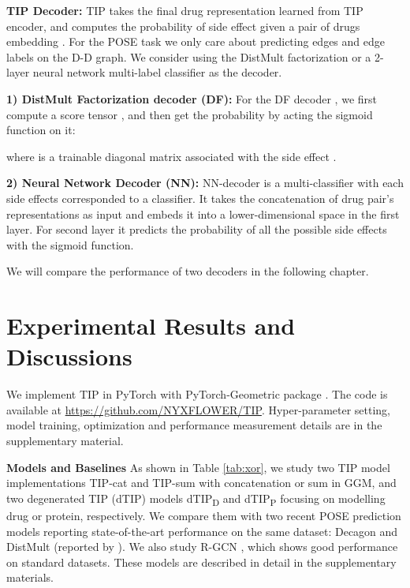\documentclass{article}
\begin{document}
\textbf{TIP Decoder:}
TIP takes the final drug representation  learned from  TIP encoder, and computes the probability  of side effect  given a pair of drugs embedding . For the POSE task we only care about predicting edges and edge labels on the  D-D graph. We consider using the DistMult factorization \cite{distmult} or a 2-layer neural network multi-label classifier as the decoder.

\textbf{1) DistMult Factorization decoder  (DF):} For the DF decoder \cite{distmult}, we first compute a  score tensor , and then get the probability by acting the sigmoid function on it:

where  is a trainable diagonal matrix associated with the side effect .

\textbf{2) Neural Network Decoder (NN):}
 NN-decoder is a multi-classifier with each side effects corresponded to a classifier. It takes the concatenation of drug pair's representations as input and embeds it into a lower-dimensional space in the first layer. For second layer it predicts the probability of all the possible side effects with the sigmoid function.  

We will compare the performance of two decoders in the following chapter.
\section{Experimental Results and Discussions}
\label{exp}
We implement TIP in PyTorch \cite{torch} with PyTorch-Geometric package \cite{pytorch}. The code is available at {\url{https://github.com/NYXFLOWER/TIP}}. Hyper-parameter setting, model training, optimization  and performance measurement details are in the supplementary material. 


\textbf{Models and Baselines} As shown in Table \ref{tab:xor}, we study two TIP model implementations TIP-cat and TIP-sum with concatenation or sum in GGM, and two degenerated TIP (dTIP) models dTIP\textsubscript{D} and dTIP\textsubscript{P} focusing on modelling drug or protein, respectively. We compare them with two recent POSE prediction models reporting state-of-the-art performance on the same dataset: Decagon \cite{decagon} and DistMult \cite{distmult} (reported by \cite{kgc}).
We also study R-GCN \cite{rgcn}, which shows good performance on standard datasets. These models are described in detail in the supplementary materials.
\end{document}

